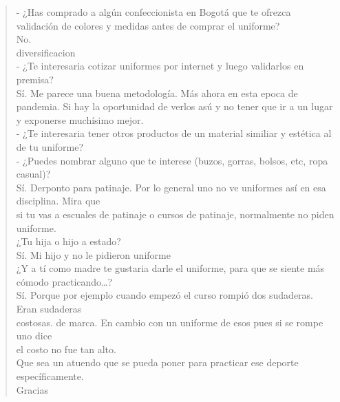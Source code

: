 \documentclass[11pt]{article}
\begin{document}
\begin{verse}
- ¿Has comprado a algún confeccionista en Bogotá que te ofrezca validación de colores y medidas antes de comprar el uniforme?\\
\hspace*{2em}No.\\
\vspace*{1em}
diversificacion\\
- ¿Te interesaria cotizar uniformes por internet y luego validarlos en premisa?\\
\vspace*{1em}
\hspace*{2em}Sí. Me parece una buena metodología. Más ahora en esta epoca de pandemia. Si hay la oportunidad de verlos asú y no tener que ir a un lugar y exponerse muchísimo mejor.\\
\vspace*{1em}
- ¿Te interesaria tener otros productos de un material similiar y estética al de tu uniforme?\\
- ¿Puedes nombrar alguno que te interese (buzos, gorras, bolsos, etc, ropa casual)?\\
\vspace*{1em}
\hspace*{2em}Sí. Derponto para patinaje. Por lo general uno no ve uniformes así en esa disciplina. Mira que\\
\hspace*{2em}si tu vas a escuales de patinaje o cursos de patinaje, normalmente no piden uniforme.\\
\vspace*{1em}
\hspace*{2em}¿Tu hija o hijo a estado?\\
\hspace*{2em}Sí. Mi hijo y no le pidieron uniforme\\
\vspace*{1em}
\hspace*{2em}¿Y a tí como madre te gustaria darle el uniforme, para que se siente más cómodo practicando\ldots{}?\\
\vspace*{1em}
\hspace*{2em}Sí. Porque por ejemplo cuando empezó el curso rompió dos sudaderas. Eran sudaderas\\
\hspace*{2em}costosas. de marca. En cambio con un uniforme de esos pues si se rompe uno dice\\
\hspace*{2em}el costo no fue tan alto.\\
\vspace*{1em}
\hspace*{2em}Que sea un atuendo que se pueda poner para practicar ese deporte específicamente.\\
\vspace*{1em}
\hspace*{2em}Gracias\\
\end{verse}
\end{document}
